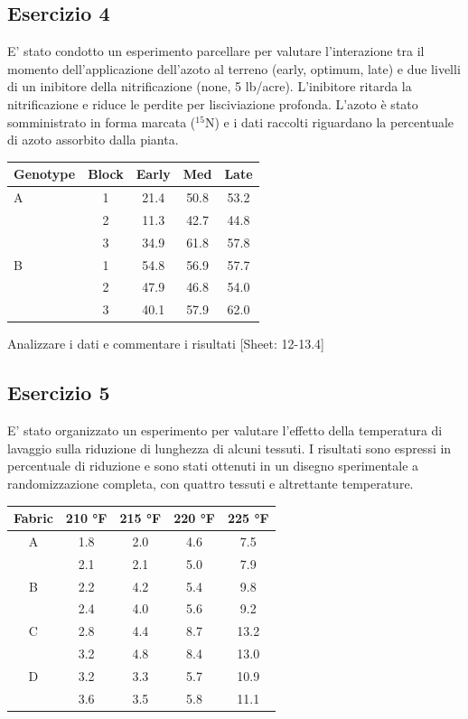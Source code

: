 \documentclass[a4paper,12pt,oneside]{book}
\begin{document}
\hypertarget{esercizio-4-6}{%
\subsection{Esercizio 4}\label{esercizio-4-6}}

E' stato condotto un esperimento parcellare per valutare l'interazione tra il momento dell'applicazione dell'azoto al terreno (early, optimum, late) e due livelli di un inibitore della nitrificazione (none, 5 lb/acre). L'inibitore ritarda la nitrificazione e riduce le perdite per lisciviazione profonda. L'azoto è stato somministrato in forma marcata (\(^{15}\)N) e i dati raccolti riguardano la percentuale di azoto assorbito dalla pianta.

\begin{longtable}[]{@{}lcccc@{}}
\toprule
Genotype & Block & Early & Med & Late \\
\midrule
\endhead
A & 1 & 21.4 & 50.8 & 53.2 \\
& 2 & 11.3 & 42.7 & 44.8 \\
& 3 & 34.9 & 61.8 & 57.8 \\
B & 1 & 54.8 & 56.9 & 57.7 \\
& 2 & 47.9 & 46.8 & 54.0 \\
& 3 & 40.1 & 57.9 & 62.0 \\
\bottomrule
\end{longtable}

Analizzare i dati e commentare i risultati
{[}Sheet: 12-13.4{]}

\hypertarget{esercizio-5-5}{%
\subsection{Esercizio 5}\label{esercizio-5-5}}

E' stato organizzato un esperimento per valutare l'effetto della temperatura di lavaggio sulla riduzione di lunghezza di alcuni tessuti. I risultati sono espressi in percentuale di riduzione e sono stati ottenuti in un disegno sperimentale a randomizzazione completa, con quattro tessuti e altrettante temperature.

\begin{longtable}[]{@{}ccccc@{}}
\toprule
Fabric & 210 °F & 215 °F & 220 °F & 225 °F \\
\midrule
\endhead
A & 1.8 & 2.0 & 4.6 & 7.5 \\
& 2.1 & 2.1 & 5.0 & 7.9 \\
B & 2.2 & 4.2 & 5.4 & 9.8 \\
& 2.4 & 4.0 & 5.6 & 9.2 \\
C & 2.8 & 4.4 & 8.7 & 13.2 \\
& 3.2 & 4.8 & 8.4 & 13.0 \\
D & 3.2 & 3.3 & 5.7 & 10.9 \\
& 3.6 & 3.5 & 5.8 & 11.1 \\
\bottomrule
\end{longtable}
\end{document}
